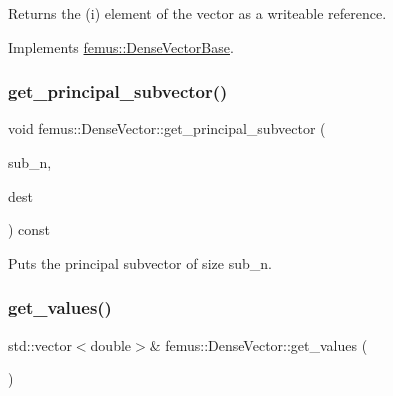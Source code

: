 \begin{DoxyItemize}
\item \begin{DoxyReturn}{Returns}
the {\ttfamily }(i) element of the vector as a writeable reference. 
\end{DoxyReturn}

\end{DoxyItemize}

Implements \mbox{\hyperlink{classfemus_1_1_dense_vector_base_a521863934215d5f43225004b091864f5}{femus\+::\+Dense\+Vector\+Base}}.

\mbox{\label{classfemus_1_1_dense_vector_aaeb514b12b7b549430fd7264a6f21742}} 
\subsubsection{\texorpdfstring{get\+\_\+principal\+\_\+subvector()}{get\_principal\_subvector()}}
{\footnotesize\ttfamily void femus\+::\+Dense\+Vector\+::get\+\_\+principal\+\_\+subvector (\begin{DoxyParamCaption}\item[{unsigned int}]{sub\+\_\+n,  }\item[{\mbox{\hyperlink{classfemus_1_1_dense_vector}{Dense\+Vector}} \&}]{dest }\end{DoxyParamCaption}) const\hspace{0.3cm}{\ttfamily [inline]}}



Puts the principal subvector of size {\ttfamily sub\+\_\+n}. 

\mbox{\label{classfemus_1_1_dense_vector_acf34d5982e06da4191d60fe823e16332}} 
\subsubsection{\texorpdfstring{get\+\_\+values()}{get\_values()}\hspace{0.1cm}{\footnotesize\ttfamily [1/2]}}
{\footnotesize\ttfamily std\+::vector$<$double$>$\& femus\+::\+Dense\+Vector\+::get\+\_\+values (\begin{DoxyParamCaption}{ }\end{DoxyParamCaption})\hspace{0.3cm}{\ttfamily [inline]}}



